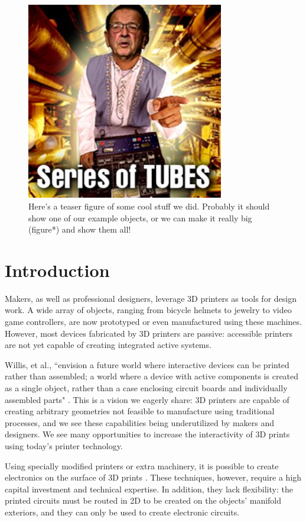 \begin{figure}[h]
\centering
    \includegraphics[width=3.4in]{figures/series-of-tubes.jpg}
\caption{Here's a teaser figure of some cool stuff we did. Probably it should show one of our example objects, or we can make it really big (figure*) and show them all!}
\label{fig:teaser}
\end{figure}

\section{Introduction}
Makers, as well as professional designers, leverage 3D printers as tools for design work.  A wide array of objects, ranging from bicycle helmets to jewelry to video game controllers, are now prototyped or even manufactured using these machines.  However, most devices fabricated by 3D printers are passive: accessible printers are not yet capable of creating integrated active systems.

Willis, et al., ``envision a future world where interactive devices can be printed rather than assembled; a world where a device with active components is created as a single object, rather than a case enclosing circuit boards and individually assembled parts" \cite{Willis-printedoptics}.  This is a vision we eagerly share: 3D printers are capable of creating arbitrary geometries not feasible to manufacture using traditional processes, and we see these capabilities being underutilized by makers and designers.  We see many opportunities to increase the interactivity of 3D prints using today's printer technology.

Using specially modified printers or extra machinery, it is possible to create electronics on the surface of 3D prints \cite{optomec} \cite{Sells-reprap}.  These techniques, however, require a high capital investment and technical expertise.  In addition, they lack flexibility: the printed circuits must be routed in 2D to be created on the objects' manifold exteriors, and they can only be used to create electronic circuits.   

